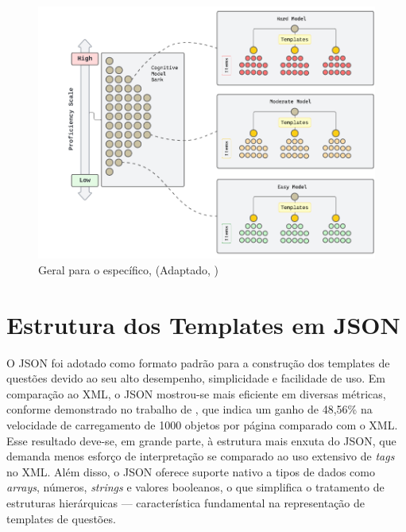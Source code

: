 \begin{figure}[ht]
	\centering
	\includegraphics[width=14cm]{./imagens/capitulo5/proficiency-scale-named}
	\caption{Geral para o específico, (Adaptado, \cite{hendrickson2010}) }
	\label{fig:proficiency-scale}
\end{figure}

\section{Estrutura dos Templates em JSON}

O JSON foi adotado como formato padrão para a construção dos templates de questões devido ao seu alto desempenho, simplicidade e facilidade de uso. Em comparação ao XML, o JSON mostrou-se mais eficiente em diversas métricas, conforme demonstrado no trabalho de \parencite{wang2011}, que indica um ganho de  48,56\% na velocidade de carregamento de 1000 objetos por página comparado com o XML. Esse resultado deve-se, em grande parte, à estrutura mais enxuta do JSON, que demanda menos esforço de interpretação se comparado ao uso extensivo de \textit{tags} no XML.  Além disso, o JSON oferece suporte nativo a tipos de dados como \textit{arrays}, números, \textit{strings} e valores booleanos, o que simplifica o tratamento de estruturas hierárquicas — característica fundamental na representação de templates de questões.

